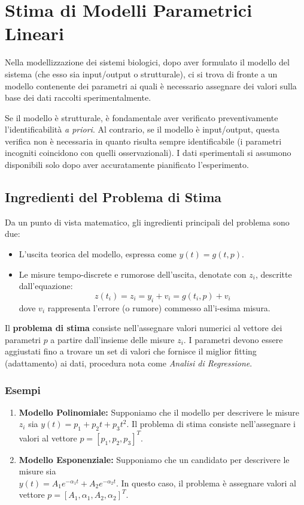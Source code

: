 \chapter{Stima di Modelli Parametrici Lineari}
Nella modellizzazione dei sistemi biologici, dopo aver formulato il modello del sistema (che esso sia input/output o strutturale), ci si trova di fronte a un modello contenente dei parametri ai quali è necessario assegnare dei valori sulla base dei dati raccolti sperimentalmente.

Se il modello è strutturale, è fondamentale aver verificato preventivamente l'identificabilità \textit{a priori}. Al contrario, se il modello è input/output, questa verifica non è necessaria in quanto risulta sempre identificabile (i parametri incogniti coincidono con quelli osservazionali). I dati sperimentali si assumono disponibili solo dopo aver accuratamente pianificato l'esperimento.

\section{Ingredienti del Problema di Stima}
Da un punto di vista matematico, gli ingredienti principali del problema sono due:
\begin{itemize}
    \item L'uscita teorica del modello, espressa come $y(t) = g(t,p)$.
    \item Le misure tempo-discrete e rumorose dell'uscita, denotate con $z_i$, descritte dall'equazione:
    \begin{equation}
        z(t_i) = z_i = y_i + v_i = g(t_i, p) + v_i
    \end{equation}
    dove $v_i$ rappresenta l'errore (o rumore) commesso all'i-esima misura.
\end{itemize}

Il \textbf{problema di stima} consiste nell'assegnare valori numerici al vettore dei parametri $p$ a partire dall'insieme delle misure $z_i$. I parametri devono essere aggiustati fino a trovare un set di valori che fornisce il miglior fitting (adattamento) ai dati, procedura nota come \textit{Analisi di Regressione}.

\subsection{Esempi}
\begin{enumerate}
    \item \textbf{Modello Polinomiale:} Supponiamo che il modello per descrivere le misure $z_i$ sia $y(t) = p_1 + p_2 t + p_3 t^2$. Il problema di stima consiste nell'assegnare i valori al vettore $p = [p_1, p_2, p_3]^T$.
    \item \textbf{Modello Esponenziale:} Supponiamo che un candidato per descrivere le misure sia \\ $y(t) = A_1 e^{-\alpha_1 t} + A_2 e^{-\alpha_2 t}$. In questo caso, il problema è assegnare valori al vettore $p = [A_1, \alpha_1, A_2, \alpha_2]^T$.
\end{enumerate}

